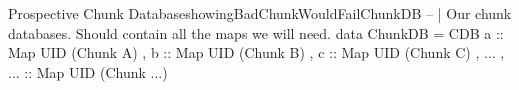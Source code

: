 \begin{pseudohaskell}{Prospective Chunk Database}{showingBadChunkWouldFailChunkDB}
-- | Our chunk databases. Should contain all the maps we will need.
data ChunkDB = CDB { a   :: Map UID (Chunk A)
                   , b   :: Map UID (Chunk B)
                   , c   :: Map UID (Chunk C)
                   , ...
                   , ... :: Map UID (Chunk ...)
                   }
\end{pseudohaskell}
